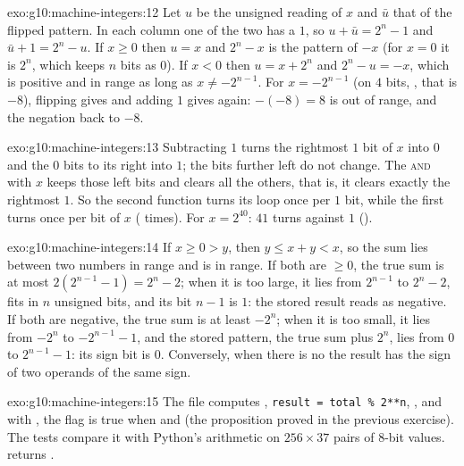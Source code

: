 \begin{solution}{exo:g10:machine-integers:12}
Let $u$ be the unsigned reading of $x$ and $\bar u$ that of the flipped pattern. In each column one of the two has a
$1$, so $u + \bar u = 2^n - 1$ and $\bar u + 1 = 2^n - u$. If $x \ge 0$ then $u = x$ and $2^n - x$ is the pattern of
$-x$ (for $x = 0$ it is $2^n$, which keeps $n$ bits as $0$). If $x < 0$ then $u = x + 2^n$ and $2^n - u = -x$, which is
positive and in range as long as $x \ne -2^{n-1}$. For $x = -2^{n-1}$ (on $4$ bits, , that is $-8$),
flipping gives  and adding $1$ gives  again: $-(-8) = 8$ is out of range, and the negation
 back to $-8$.
\end{solution}

\begin{solution}{exo:g10:machine-integers:13}
Subtracting $1$ turns the rightmost $1$ bit of $x$ into $0$ and the $0$ bits to its right into $1$; the bits further
left do not change. The \textsc{and} with $x$ keeps those left bits and clears all the others, that is, it clears
exactly the rightmost $1$. So the second function turns its loop once per $1$ bit, while the first turns once per bit
of $x$ ( times). For $x = 2^{40}$: $41$ turns against $1$ ().
\end{solution}

\begin{solution}{exo:g10:machine-integers:14}
If $x \ge 0 > y$, then $y \le x + y < x$, so the sum lies between two numbers in range and is in range. If both are
$\ge 0$, the true sum is at most $2(2^{n-1} - 1) = 2^n - 2$; when it is too large, it lies from $2^{n-1}$ to $2^n - 2$,
fits in $n$ unsigned bits, and its bit $n-1$ is $1$: the stored result reads as negative. If both are negative, the
true sum is at least $-2^n$; when it is too small, it lies from $-2^n$ to $-2^{n-1} - 1$, and the stored pattern, the
true sum plus $2^n$, lies from $0$ to $2^{n-1} - 1$: its sign bit is $0$. Conversely, when there is no  the
result has the sign of two operands of the same sign.
\end{solution}

\begin{solution}{exo:g10:machine-integers:15}
The file  computes , \texttt{result = total \% 2**n}, ,
and with , the  flag is true when  and
 (the proposition proved in the previous exercise). The tests compare it with
Python's arithmetic on $256 \times 37$ pairs of $8$-bit values.  returns
.
\end{solution}

